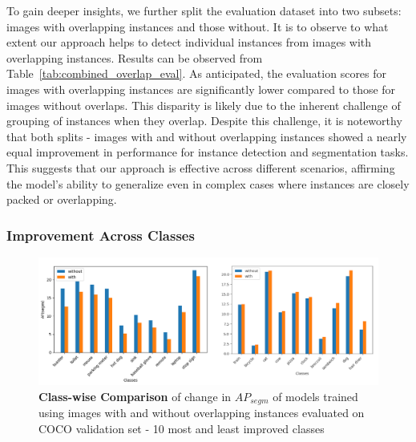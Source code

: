 To gain deeper insights, we further split the evaluation dataset into two subsets: images with overlapping instances and those without. It is to observe to what extent our approach helps to detect individual instances from images with overlapping instances. Results can be observed from Table~\ref{tab:combined_overlap_eval}. As anticipated, the evaluation scores for images with overlapping instances are significantly lower compared to those for images without overlaps. This disparity is likely due to the inherent challenge of grouping of instances when they overlap. Despite this challenge, it is noteworthy that both splits - images with and without overlapping instances showed a nearly equal improvement in performance for instance detection and segmentation tasks. This suggests that our approach is effective across different scenarios, affirming the model’s ability to generalize even in complex cases where instances are closely packed or overlapping.

\subsubsection{Improvement Across Classes}
\begin{figure}
	\centering
	\includegraphics[width=1.05\textwidth]{Images/main/overlap_classes_new.png}
	\caption[\textbf{Training Without Overlapping Instances - Class-wise Comparison}]{\textbf{Class-wise Comparison} of change in \(AP_{segm}\) of models trained using images with and without overlapping instances evaluated on COCO validation set - 10 most and least improved classes}
	\label{fig:overlap_classes}
\end{figure}

